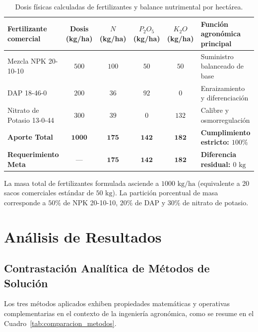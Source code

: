\begin{table}[H]
\centering
\caption{Dosis físicas calculadas de fertilizantes y balance nutrimental por hectárea.}\label{tab:resultados_dosis}
\begin{AulatexTable}[\linewidth]
\small
\setlength{\tabcolsep}{3.5pt}
\begin{tabularx}{\linewidth}{@{}>{\raggedright\arraybackslash}p{2.8cm}cccc>{\raggedright\arraybackslash}X@{}}
\toprule
\textbf{Fertilizante comercial} & \textbf{Dosis (kg/ha)} & \textbf{$N$ (kg/ha)} & \textbf{$P_2O_5$ (kg/ha)} & \textbf{$K_2O$ (kg/ha)} & \textbf{Función agronómica principal} \\
\midrule
Mezcla NPK 20-10-10 & $500$ & $100$ & $50$ & $50$ & Suministro balanceado de base \\
DAP 18-46-0 & $200$ & $36$ & $92$ & $0$ & Enraizamiento y diferenciación \\
Nitrato de Potasio 13-0-44 & $300$ & $39$ & $0$ & $132$ & Calibre y osmorregulación \\
\midrule
\textbf{Aporte Total} & $\mathbf{1000}$ & $\mathbf{175}$ & $\mathbf{142}$ & $\mathbf{182}$ & \textbf{Cumplimiento estricto: $100\%$} \\
\textbf{Requerimiento Meta} & --- & $\mathbf{175}$ & $\mathbf{142}$ & $\mathbf{182}$ & \textbf{Diferencia residual: $0\text{ kg}$} \\
\bottomrule
\end{tabularx}
\end{AulatexTable}
\end{table}
\FloatBarrier

La masa total de fertilizantes formulada asciende a $1000\text{ kg/ha}$ (equivalente a 20 sacos comerciales estándar de $50\text{ kg}$). La partición porcentual de masa corresponde a $50\%$ de NPK 20-10-10, $20\%$ de DAP y $30\%$ de nitrato de potasio.

\section{Análisis de Resultados}

\subsection{Contrastación Analítica de Métodos de Solución}

Los tres métodos aplicados exhiben propiedades matemáticas y operativas complementarias en el contexto de la ingeniería agronómica, como se resume en el Cuadro~\ref{tab:comparacion_metodos}.

